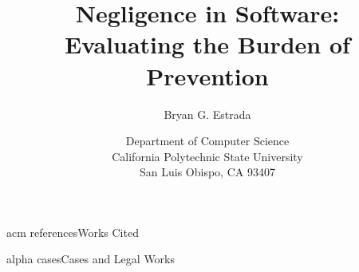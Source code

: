 \documentclass[11pt]{book}
\begin{document}

\title{Negligence in Software:\\Evaluating the Burden of Prevention}
\author{Bryan G. Estrada}
\date{Department of Computer Science\\
      California Polytechnic State University\\
      San Luis Obispo, CA  93407}

\begin{titlepage}
\vfill
\maketitle\thispagestyle{empty}
\vfill
\end{titlepage}

\doublespace
\tableofcontents
\newpage










\appendix




{acm}
{references}{Works Cited}

{alpha}
{cases}{Cases and Legal Works}
\end{document}
